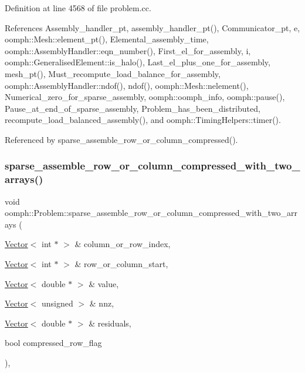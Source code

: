 Definition at line 4568 of file problem.\+cc.



References Assembly\+\_\+handler\+\_\+pt, assembly\+\_\+handler\+\_\+pt(), Communicator\+\_\+pt, e, oomph\+::\+Mesh\+::element\+\_\+pt(), Elemental\+\_\+assembly\+\_\+time, oomph\+::\+Assembly\+Handler\+::eqn\+\_\+number(), First\+\_\+el\+\_\+for\+\_\+assembly, i, oomph\+::\+Generalised\+Element\+::is\+\_\+halo(), Last\+\_\+el\+\_\+plus\+\_\+one\+\_\+for\+\_\+assembly, mesh\+\_\+pt(), Must\+\_\+recompute\+\_\+load\+\_\+balance\+\_\+for\+\_\+assembly, oomph\+::\+Assembly\+Handler\+::ndof(), ndof(), oomph\+::\+Mesh\+::nelement(), Numerical\+\_\+zero\+\_\+for\+\_\+sparse\+\_\+assembly, oomph\+::oomph\+\_\+info, oomph\+::pause(), Pause\+\_\+at\+\_\+end\+\_\+of\+\_\+sparse\+\_\+assembly, Problem\+\_\+has\+\_\+been\+\_\+distributed, recompute\+\_\+load\+\_\+balanced\+\_\+assembly(), and oomph\+::\+Timing\+Helpers\+::timer().



Referenced by sparse\+\_\+assemble\+\_\+row\+\_\+or\+\_\+column\+\_\+compressed().

\mbox{\label{classoomph_1_1Problem_a19520f8a38dc1dabb33cd7f397ff3506}} 
\subsubsection{\texorpdfstring{sparse\+\_\+assemble\+\_\+row\+\_\+or\+\_\+column\+\_\+compressed\+\_\+with\+\_\+two\+\_\+arrays()}{sparse\_assemble\_row\_or\_column\_compressed\_with\_two\_arrays()}}
{\footnotesize\ttfamily void oomph\+::\+Problem\+::sparse\+\_\+assemble\+\_\+row\+\_\+or\+\_\+column\+\_\+compressed\+\_\+with\+\_\+two\+\_\+arrays (\begin{DoxyParamCaption}\item[{\hyperlink{classoomph_1_1Vector}{Vector}$<$ int $\ast$ $>$ \&}]{column\+\_\+or\+\_\+row\+\_\+index,  }\item[{\hyperlink{classoomph_1_1Vector}{Vector}$<$ int $\ast$ $>$ \&}]{row\+\_\+or\+\_\+column\+\_\+start,  }\item[{\hyperlink{classoomph_1_1Vector}{Vector}$<$ double $\ast$ $>$ \&}]{value,  }\item[{\hyperlink{classoomph_1_1Vector}{Vector}$<$ unsigned $>$ \&}]{nnz,  }\item[{\hyperlink{classoomph_1_1Vector}{Vector}$<$ double $\ast$ $>$ \&}]{residuals,  }\item[{bool}]{compressed\+\_\+row\+\_\+flag }\end{DoxyParamCaption})\hspace{0.3cm}{\ttfamily [private]}, {\ttfamily [virtual]}}



